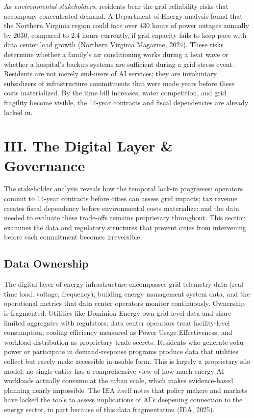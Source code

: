 \documentclass[10pt, twocolumn]{article}
\begin{document}
As \textit{environmental stakeholders}, residents bear the grid reliability risks that accompany concentrated demand. A Department of Energy analysis found that the Northern Virginia region could face over 430 hours of power outages annually by 2030, compared to 2.4 hours currently, if grid capacity fails to keep pace with data center load growth (Northern Virginia Magazine, 2024). These risks determine whether a family's air conditioning works during a heat wave or whether a hospital's backup systems are sufficient during a grid stress event. Residents are not merely end-users of AI services; they are involuntary subsidizers of infrastructure commitments that were made years before these costs materialized. By the time bill increases, water competition, and grid fragility become visible, the 14-year contracts and fiscal dependencies are already locked in.

\section*{III. The Digital Layer \& Governance}

The stakeholder analysis reveals how the temporal lock-in progresses: operators commit to 14-year contracts before cities can assess grid impacts; tax revenue creates fiscal dependency before environmental costs materialize; and the data needed to evaluate these trade-offs remains proprietary throughout. This section examines the data and regulatory structures that prevent cities from intervening before each commitment becomes irreversible.

\subsection*{Data Ownership}

The digital layer of energy infrastructure encompasses grid telemetry data (real-time load, voltage, frequency), building energy management system data, and the operational metrics that data center operators monitor continuously. Ownership is fragmented. Utilities like Dominion Energy own grid-level data and share limited aggregates with regulators; data center operators treat facility-level consumption, cooling efficiency measured as Power Usage Effectiveness, and workload distribution as proprietary trade secrets. Residents who generate solar power or participate in demand-response programs produce data that utilities collect but rarely make accessible in usable form. This is largely a proprietary silo model: no single entity has a comprehensive view of how much energy AI workloads actually consume at the urban scale, which makes evidence-based planning nearly impossible. The IEA itself notes that policy makers and markets have lacked the tools to assess implications of AI's deepening connection to the energy sector, in part because of this data fragmentation (IEA, 2025).
\end{document}
